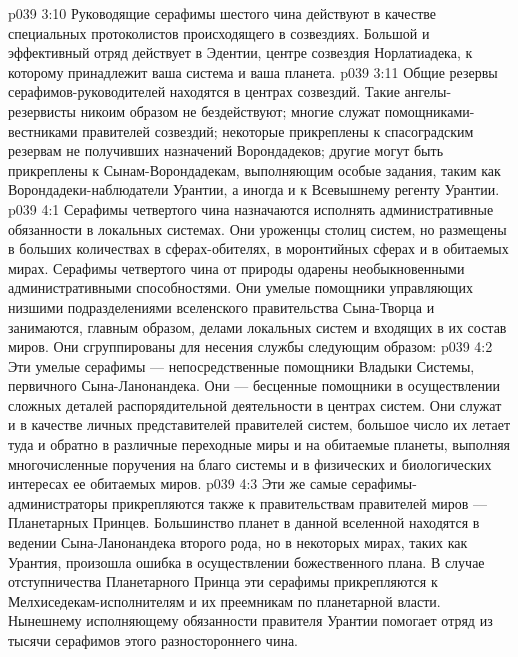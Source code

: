 \vs p039 3:10 \pc {}\bibnobreakspace {} Руководящие серафимы шестого чина действуют в качестве специальных протоколистов происходящего в созвездиях. Большой и эффективный отряд действует в Эдентии, центре созвездия Норлатиадека, к которому принадлежит ваша система и ваша планета.
\vs p039 3:11 \pc {}\bibnobreakspace {} Общие резервы серафимов\hyp{}руководителей находятся в центрах созвездий. Такие ангелы\hyp{}резервисты никоим образом не бездействуют; многие служат помощниками\hyp{}вестниками правителей созвездий; некоторые прикреплены к спасоградским резервам не получивших назначений Ворондадеков; другие могут быть прикреплены к Сынам\hyp{}Ворондадекам, выполняющим особые задания, таким как Ворондадеки\hyp{}наблюдатели Урантии, а иногда и к Всевышнему регенту Урантии.
\vs p039 4:1 Серафимы четвертого чина назначаются исполнять административные обязанности в локальных системах. Они уроженцы столиц систем, но размещены в больших количествах в сферах\hyp{}обителях, в моронтийных сферах и в обитаемых мирах. Серафимы четвертого чина от природы одарены необыкновенными административными способностями. Они умелые помощники управляющих низшими подразделениями вселенского правительства Сына\hyp{}Творца и занимаются, главным образом, делами локальных систем и входящих в их состав миров. Они сгруппированы для несения службы следующим образом:
\vs p039 4:2 \pc {}\bibnobreakspace {} Эти умелые серафимы --- непосредственные помощники Владыки Системы, первичного Сына\hyp{}Ланонандека. Они --- бесценные помощники в осуществлении сложных деталей распорядительной деятельности в центрах систем. Они служат и в качестве личных представителей правителей систем, большое число их летает туда и обратно в различные переходные миры и на обитаемые планеты, выполняя многочисленные поручения на благо системы и в физических и биологических интересах ее обитаемых миров.
\vs p039 4:3 Эти же самые серафимы\hyp{}администраторы прикрепляются также к правительствам правителей миров --- Планетарных Принцев. Большинство планет в данной вселенной находятся в ведении Сына\hyp{}Ланонандека второго рода, но в некоторых мирах, таких как Урантия, произошла ошибка в осуществлении божественного плана. В случае отступничества Планетарного Принца эти серафимы прикрепляются к Мелхиседекам\hyp{}исполнителям и их преемникам по планетарной власти. Нынешнему исполняющему обязанности правителя Урантии помогает отряд из тысячи серафимов этого разностороннего чина.
